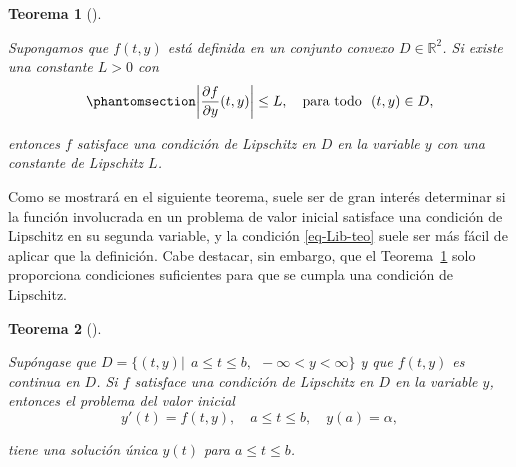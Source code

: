 \documentclass[
  spanish,
  us-letterpaper,
]{scrreprt}
\theoremstyle{plain}
\newtheorem{theorem}{Teorema}[chapter]
\theoremstyle{definition}
\theoremstyle{remark}
\begin{document}
\begin{theorem}[]\protect\hypertarget{thm-Lib-teo}{}\label{thm-Lib-teo}

Supongamos que \(f(t, y)\) está definida en un conjunto convexo
\(D \in \mathbb{R}^2\). Si existe una constante \(L > 0\) con
\begin{equation}\phantomsection\label{eq-Lib-teo}{
\left|\dfrac{\partial f}{\partial y}(t,y) \right| \leq L, \quad \text{para todo} \ \ (t,y)\in D,
}\end{equation}

entonces \(f\) satisface una condición de Lipschitz en \(D\) en la
variable \(y\) con una constante de Lipschitz \(L\).

\end{theorem}

Como se mostrará en el siguiente teorema, suele ser de gran interés
determinar si la función involucrada en un problema de valor inicial
satisface una condición de Lipschitz en su segunda variable, y la
condición \ref{eq-Lib-teo} suele ser más fácil de aplicar que la
definición. Cabe destacar, sin embargo, que el Teorema~\ref{thm-Lib-teo}
solo proporciona condiciones suficientes para que se cumpla una
condición de Lipschitz.

\begin{theorem}[]\protect\hypertarget{thm-uniq-sol}{}\label{thm-uniq-sol}

Supóngase que
\(D = \{(t, y) | \ \ a \leq t \leq b, \ \  -\infty < y < \infty \}\) y
que \(f (t, y)\) es continua en \(D\). Si \(f\) satisface una condición
de Lipschitz en \(D\) en la variable \(y\), entonces el problema del
valor inicial \[
y'(t)= f(t,y), \quad a\leq t \leq b, \quad y(a) = \alpha,
\]

tiene una solución única \(y(t)\) para \(a\leq t \leq b\).

\end{theorem}
\end{document}
